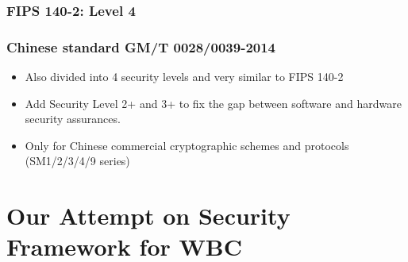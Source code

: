 \documentclass{beamer}
\begin{document}
\frame
{
\frametitle{FIPS 140-2: Level 4}

\begin{center}
\end{center}

}

\frame
{
\frametitle{Chinese standard GM/T 0028/0039-2014}
\begin{itemize}
\setlength{\itemsep}{12pt}
\item Also divided into 4 security levels and very similar to FIPS 140-2

\item Add Security Level 2+ and 3+ to fix the gap between software and hardware security assurances.

\item Only for Chinese commercial cryptographic schemes and protocols (SM1/2/3/4/9 series)

\end{itemize}
}

\section{Our Attempt on Security Framework for WBC}
\end{document}
